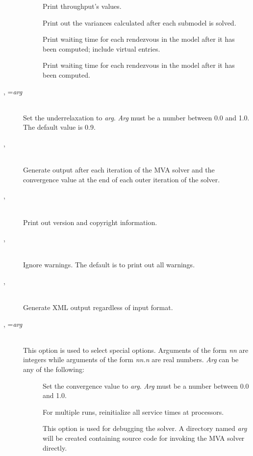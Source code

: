 \begin{description}
\begin{description}
\item[]
Print throughput's values.
\item[]
Print out the variances calculated after each submodel is solved.
\item[]
Print waiting time for each rendezvous in the model after it has been computed; include virtual entries.
\item[]
Print waiting time for each rendezvous in the model after it has been computed.
\end{description}
\item[\flag{u}{}, \longopt{underrelaxation}=\emph{arg}]~\\
Set the underrelaxation to \emph{arg}.
\emph{Arg} must be a number between 0.0 and 1.0.
The default value is 0.9.
\item[\flag{v}{}, \longopt{verbose}]~\\
Generate output after each iteration of the MVA solver and the convergence value at the end of each outer iteration of the solver.
\item[\flag{V}{}, \longopt{version}]~\\
Print out version and copyright information.
\item[\flag{w}{}, \longopt{no-warnings}]~\\
Ignore warnings.  The default is to print out all warnings.
\item[\flag{x}{}, \longopt{xml}]~\\
Generate XML output regardless of input format.
\item[\flag{z}{}, \longopt{special}=\emph{arg}]~\\
This option is used to select special options.  Arguments of the form
\emph{nn} are integers while arguments of the form \emph{nn.n} are real
numbers.  \emph{Arg} can be any of the following:
\begin{description}
\item[]
Set the convergence value to \emph{arg}.  
\emph{Arg} must be a number between 0.0 and 1.0.
\item[]
For multiple runs, reinitialize all service times at processors.
\item[]
This option is used for debugging the solver.
A directory named \emph{arg} will be created containing source code for invoking the MVA solver directly.

\end{description}
\end{description}
